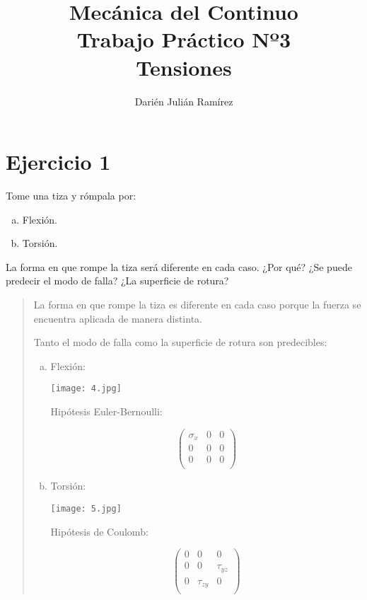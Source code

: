 \documentclass[a4paper,12pt,twoside,final,spanish]{article}
\title{\Huge Mecánica del Continuo\\
Trabajo Práctico Nº3\\
Tensiones}
\author{Darién Julián Ramírez}
\date{\vspace{-5ex}}
\begin{document}
\maketitle %

\section*{Ejercicio 1}

Tome una tiza y rómpala por:
\begin{enumerate}[a.]
\item Flexión.
\item Torsión.
\end{enumerate}

La forma en que rompe la tiza será diferente en cada caso. ¿Por qué? ¿Se puede predecir el modo de falla? ¿La superficie de rotura?

\dotfill

\begin{quote}

La forma en que rompe la tiza es diferente en cada caso porque la fuerza se encuentra aplicada de manera distinta.

Tanto el modo de falla como la superficie de rotura son predecibles:

\begin{enumerate}[a.]
\item Flexión:

\begin{center}
\texttt{[image: 4.jpg]}
\end{center}

Hipótesis Euler-Bernoulli:

\[
\left(\begin{matrix}
\sigma_{x} & 0 & 0\\
0 & 0 & 0\\
0 & 0 & 0\\
\end{matrix}\right)
\]

\item Torsión:

\begin{center}
\texttt{[image: 5.jpg]}
\end{center}

Hipótesis de Coulomb:

\[
\left(\begin{matrix}
0 & 0 & 0\\
0 & 0 & \tau_{yz}\\
0 & \tau_{zy} & 0\\
\end{matrix}\right)
\]
\end{enumerate}
\end{quote}
\end{document}
